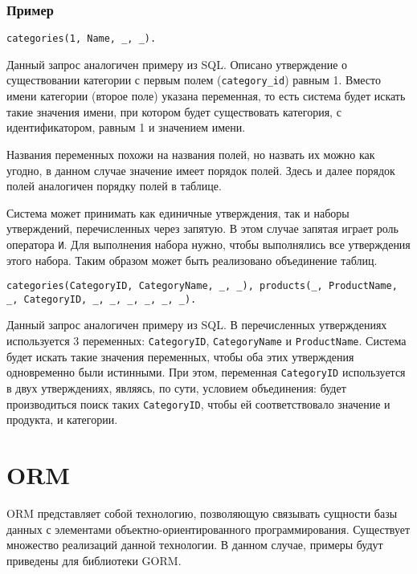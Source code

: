 \begin{appendices}
\subsubsection*{Пример}

\begin{lstlisting}[label=prolog-syntax-ex-1,caption=Пример запроса на Prolog]
categories(1, Name, _, _).
\end{lstlisting}

Данный запрос аналогичен примеру из SQL. Описано утверждение о существовании категории с первым полем (\texttt{category\_id}) равным 1. Вместо имени категории (второе поле) указана переменная, то есть система будет искать такие значения имени, при котором будет существовать категория, с идентификатором, равным 1 и значением имени.

Названия переменных похожи на названия полей, но назвать их можно как угодно, в данном случае значение имеет порядок полей. Здесь и далее порядок полей аналогичен порядку полей в таблице.

Система может принимать как единичные утверждения, так и наборы утверждений, перечисленных через запятую. В этом случае запятая играет роль оператора \texttt{И}. Для выполнения набора нужно, чтобы выполнялись все утверждения этого набора. Таким образом может быть реализовано объединение таблиц.

\begin{lstlisting}[label=prolog-syntax-ex-2,caption=Пример запроса с объединением на Prolot]
categories(CategoryID, CategoryName, _, _), products(_, ProductName, _, CategoryID, _, _, _, _, _, _).
\end{lstlisting}

Данный запрос аналогичен примеру из SQL. В перечисленных утверждениях используется 3 переменных: \texttt{CategoryID}, \texttt{CategoryName} и \texttt{ProductName}. Система будет искать такие значения переменных, чтобы оба этих утверждения одновременно были истинными. При этом, переменная \texttt{CategoryID} используется в двух утверждениях, являясь, по сути, условием объединения: будет производиться поиск таких \texttt{CategoryID}, чтобы ей соответствовало значение и продукта, и категории.

\section{ORM}

ORM представляет собой технологию, позволяющую связывать сущности базы данных с элементами объектно-ориентированного программирования. Существует множество реализаций данной технологии. В данном случае, примеры будут приведены для библиотеки GORM.


\end{appendices}
